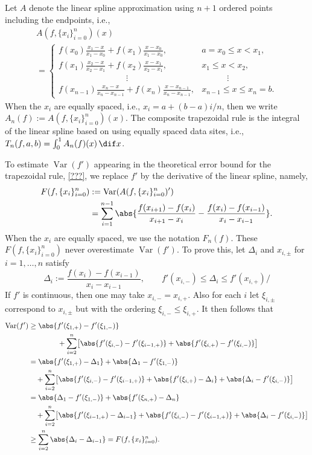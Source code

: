 \documentclass[]{article}
\DeclareMathOperator{\Var}{Var}
\theoremstyle{definition}
\theoremstyle{remark}
\newcommand{\datasites}{\{x_i\}_{i=0}^n}
\begin{document}
Let $A$ denote the linear spline approximation using $n+1$ ordered points including the endpoints, i.e., 
\begin{multline}
\label{Andef}
A(f,\datasites)(x) \\
= \begin{cases}  \displaystyle f(x_0)\frac{x_1-x}{x_1-x_0} + f(x_1)\frac{x-x_0}{x_1-x_0}, & a=x_0 \le x < x_1, \\
\displaystyle f(x_1)\frac{x_2-x}{x_2-x_1} + f(x_2)\frac{x-x_1}{x_2-x_1}, & x_1 \le x < x_2, \\
\qquad \qquad \qquad \qquad \vdots & \qquad \quad \vdots \\
\displaystyle f(x_{n-1})\frac{x_n-x}{x_n-x_{n-1}} + f(x_n)\frac{x-x_{n-1}}{x_n-x_{n-1}}, & x_{n-1} \le x \le x_n=b.
\end{cases}
\end{multline}   
When the $x_i$ are equally spaced, i.e., $x_i=a+(b-a)i/n$, then we write $A_n(f):=A(f,\datasites)(x)$.  The composite trapezoidal rule is the integral of the linear spline based on using equally spaced data sites, i.e., $T_n(f,a,b) = \int_0^1 A_n(f)(x) \, \dif x$.  

To estimate $\Var(f')$ appearing in the theoretical error bound for the trapezoidal rule, \eqref{???}, we replace $f'$ by the derivative of the linear spline, namely, 
\begin{align*}
F(f,\datasites) &: = \Var(A(f,\datasites)') \\
& = \sum_{i=1}^{n-1} \abs{ \frac{f(x_{i+1})-f(x_{i})}{x_{i+1}-x_{i}} - \frac{f(x_i)-f(x_{i-1})}{x_i-x_{i-1}}}.
\end{align*}
When the $x_i$ are equally spaced, we use the notation $F_n(f)$.  These $F(f,\datasites)$ never overestimate $\Var(f')$.  To prove this, let $\Delta_i$ and $x_{i,\pm}$ for $i=1, \ldots, n$ satisfy
\begin{equation*}
\Delta_i:= \frac{f(x_i)-f(x_{i-1})}{x_i-x_{i-1}}, \qquad f'(x_{i,-}) \le \Delta_i \le f'(x_{i,+})/
\end{equation*}
If $f'$ is continuous, then one may take $x_{i,-}=x_{i,+}$.  Also for each $i$ let $\xi_{i,\pm}$ correspond to $x_{i,\pm}$ but with the ordering $\xi_{i,-} \le \xi_{i,+} $.  It then follows that
\begin{align*}
\Var(f') & \ge \abs{f'(\xi_{1,+}) - f'(\xi_{1,-})}  \\
& \qquad \qquad  + \sum_{i=2}^n \bigl [ \abs{f'(\xi_{i,-}) - f'(\xi_{i-1,+})}+ \abs{f'(\xi_{i,+}) - f'(\xi_{i,-})} \bigr ] \\
& = \abs{f'(\xi_{1,+}) - \Delta_1} + \abs{\Delta_1- f'(\xi_{1,-})}  \\
& \quad  + \sum_{i=2}^n \bigl[ \abs{f'(\xi_{i,-}) - f'(\xi_{i-1,+})}+ \abs{f'(\xi_{i,+}) -\Delta_i} + \abs{\Delta_i- f'(\xi_{i,-})} \bigr] \\
& =  \abs{\Delta_1- f'(\xi_{1,-})} + \abs{f'(\xi_{n,+}) - \Delta_n} \\
& \quad  + \sum_{i=2}^n \bigl[\abs{f'(\xi_{i-1,+}) -\Delta_{i-1}} + \abs{f'(\xi_{i,-}) - f'(\xi_{i-1,+})}+  \abs{\Delta_i- f'(\xi_{i,-})} \bigr] \\
& \ge \sum_{i=2}^n \abs{\Delta_i -\Delta_{i-1}} = F(f,\datasites).
\end{align*}
\end{document}
